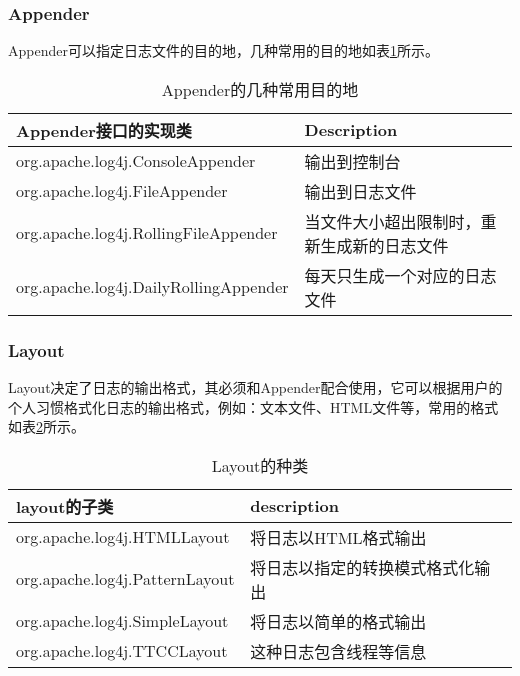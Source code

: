 \subsubsection{Appender}
Appender可以指定日志文件的目的地，几种常用的目的地如表\ref{appender}所示。
\begin{table}
\begin{tabular}{lp{12em}}
\toprule
\textbf{Appender接口的实现类}&\textbf{Description}\\
\midrule
org.apache.log4j.ConsoleAppender&输出到控制台\\
org.apache.log4j.FileAppender&输出到日志文件\\
org.apache.log4j.RollingFileAppender&当文件大小超出限制时，重新生成新的日志文件\\
org.apache.log4j.DailyRollingAppender&每天只生成一个对应的日志文件\\
\bottomrule
\end{tabular}
\caption{Appender的几种常用目的地}
\label{appender}
\end{table}
\subsubsection{Layout}
Layout决定了日志的输出格式，其必须和Appender配合使用，它可以根据用户的个人习惯格式化日志的输出格式，例如：文本文件、HTML文件等，常用的格式如表\ref{layout}所示。
\begin{table}
\begin{tabular}{ll}
\toprule
\textbf{layout的子类}&\textbf{description}\\
\midrule
org.apache.log4j.HTMLLayout&将日志以HTML格式输出\\
org.apache.log4j.PatternLayout&将日志以指定的转换模式格式化输出\\
org.apache.log4j.SimpleLayout&将日志以简单的格式输出\\
org.apache.log4j.TTCCLayout&这种日志包含线程等信息\\
\bottomrule
\end{tabular}
\caption{Layout的种类}
\label{layout}
\end{table}
